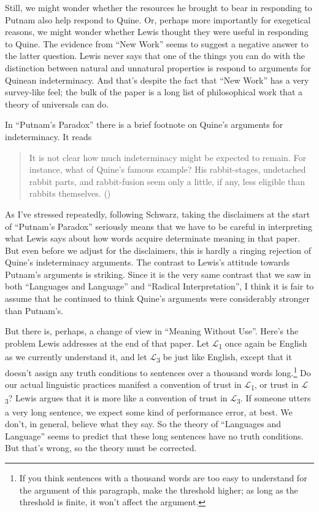 \documentclass[
  11pt,
  letterpaper,
  DIV=11,
  numbers=noendperiod,
  twoside]{scrartcl}
\begin{document}
Still, we might wonder whether the resources he brought to bear in
responding to Putnam also help respond to Quine. Or, perhaps more
importantly for exegetical reasons, we might wonder whether Lewis
thought they were useful in responding to Quine. The evidence from ``New
Work'' seems to suggest a negative answer to the latter question. Lewis
never says that one of the things you can do with the distinction
between natural and unnatural properties is respond to arguments for
Quinean indeterminacy. And that's despite the fact that ``New Work'' has
a very survey-like feel; the bulk of the paper is a long list of
philosophical work that a theory of universals can do.

In ``Putnam's Paradox'' there is a brief footnote on Quine's arguments
for indeterminacy. It reads

\begin{quote}
It is not clear how much indeterminacy might be expected to remain. For
instance, what of Quine's famous example? His rabbit-stages, undetached
rabbit parts, and rabbit-fusion seem only a little, if any, less
eligible than rabbits themselves. ()
\end{quote}

As I've stressed repeatedly, following Schwarz, taking the disclaimers
at the start of ``Putnam's Paradox'' seriously means that we have to be
careful in interpreting what Lewis says about how words acquire
determinate meaning in that paper. But even before we adjust for the
disclaimers, this is hardly a ringing rejection of Quine's indeterminacy
arguments. The contrast to Lewis's attitude towards Putnam's arguments
is striking. Since it is the very same contrast that we saw in both
``Languages and Language'' and ``Radical Interpretation'', I think it is
fair to assume that he continued to think Quine's arguments were
considerably stronger than Putnam's.

But there is, perhaps, a change of view in ``Meaning Without Use''.
Here's the problem Lewis addresses at the end of that paper. Let
\(\mathcal{L}\)\textsubscript{1} once again be English as we currently
understand it, and let \(\mathcal{L}\)\textsubscript{3} be just like
English, except that it doesn't assign any truth conditions to sentences
over a thousand words long.\footnote{If you think sentences with a
  thousand words are too easy to understand for the argument of this
  paragraph, make the threshold higher; as long as the threshold is
  finite, it won't affect the argument.} Do our actual linguistic
practices manifest a convention of trust in
\(\mathcal{L}\)\textsubscript{1}, or trust in
\(\mathcal{L}\)\textsubscript{3}? Lewis argues that it is more like a
convention of trust in \(\mathcal{L}\)\textsubscript{3}. If someone
utters a very long sentence, we expect some kind of performance error,
at best. We don't, in general, believe what they say. So the theory of
``Languages and Language'' seems to predict that these long sentences
have no truth conditions. But that's wrong, so the theory must be
corrected.
\end{document}
